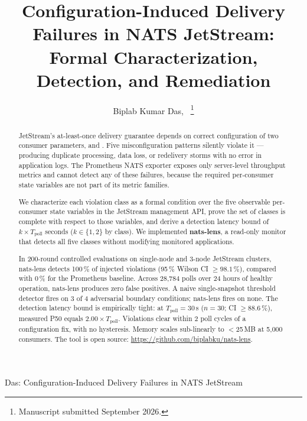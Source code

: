 \documentclass[journal]{IEEEtran}
\begin{document}
\title{Configuration-Induced Delivery Failures in NATS JetStream:\\
  Formal Characterization, Detection, and Remediation}

\author{Biplab Kumar Das,~%
\thanks{Manuscript submitted September 2026.}}

%
{Das: Configuration-Induced Delivery Failures in NATS JetStream}

\maketitle

\begin{abstract}
JetStream's at-least-once delivery guarantee depends on correct
configuration of two consumer parameters,  and
. Five misconfiguration patterns silently violate
it --- producing duplicate processing, data loss, or redelivery storms
with no error in application logs. The Prometheus NATS exporter exposes
only server-level throughput metrics and cannot detect any of these
failures, because the required per-consumer state variables are not part
of its metric families.

We characterize each violation class as a formal condition over the five
observable per-consumer state variables in the JetStream management API,
prove the set of classes is complete with respect to those variables, and
derive a detection latency bound of $k \times T_\text{poll}$ seconds
($k \in \{1,2\}$ by class). We implemented \textbf{nats-lens}, a
read-only monitor that detects all five classes without modifying
monitored applications.

In 200-round controlled evaluations on single-node and 3-node JetStream
clusters, nats-lens detects 100\,\% of injected violations
(95\,\% Wilson CI $\geq 98.1\,\%$), compared with 0\,\% for the
Prometheus baseline. Across 28,784 polls over 24 hours of healthy
operation, nats-lens produces zero false positives. A naive
single-snapshot threshold detector fires on 3 of 4 adversarial boundary
conditions; nats-lens fires on none. The detection latency bound is
empirically tight: at $T_\text{poll}{=}30$\,s ($n{=}30$; CI $\geq 88.6\,\%$), measured P50 equals
$2.00 \times T_\text{poll}$. Violations clear within 2 poll cycles of a
configuration fix, with no hysteresis. Memory scales sub-linearly to
$<$25\,MB at 5{,}000 consumers. The tool is open source:
\url{https://github.com/biplabku/nats-lens}.
\end{abstract}
\end{document}

